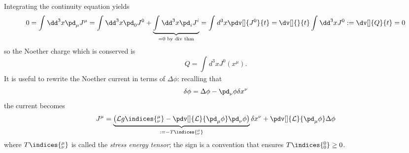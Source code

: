 Integrating the continuity equation yields
$$0=\int_{}^{}\dd^3x \pd_\mu J^\mu = \int_{}^{}\dd^3x \pd_0J^0+
\underbrace{\int_{}^{}\dd^3x\pd_i J^i}_{=0\text{ by div thm}}=
\int_{}^{}d^3x\pdv[]{J^0}{t} = \dv[]{}{t}\int_{}^{}\dd^3xJ^0:=\dv[]{Q}{t}=0$$
so the Noether charge which is conserved is
$$Q = \int_{}^{}d^3xJ^0(x^\mu).$$
It is useful to rewrite the Noether current in terms of $\Delta\phi$:
recalling that
$$\delta\phi = \Delta\phi - \pd_\nu\phi\delta x^\nu$$
the current becomes
$$J^\mu = \underbrace{\left(\mathcal{L}g\indices{^\mu_\nu}-\pdv[]{\mathcal{L}}{
\pd_\mu\phi}\pd_\nu\phi\right)}_{:=-T\indices{^\mu_\nu}}\delta x^\nu +
\pdv[]{\mathcal{L}}{\pd_\mu\phi}\Delta\phi$$
where $T\indices{^\mu_\nu}$ is called the \textit{stress energy tensor}; the sign
is a convention that ensures $T\indices{^0_0}\geq0$.
